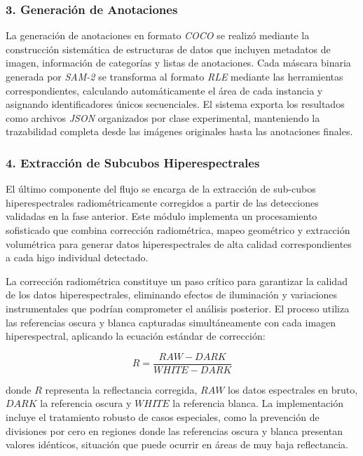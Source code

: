 \subsubsection{3. Generación de Anotaciones}

La generación de anotaciones en formato \emph{COCO} se realizó mediante la construcción sistemática de estructuras de datos que incluyen metadatos de imagen, información de categorías y listas de anotaciones. Cada máscara binaria generada por \emph{SAM-2} se transforma al formato \emph{RLE} mediante las herramientas correspondientes, calculando automáticamente el área de cada instancia y asignando identificadores únicos secuenciales. El sistema exporta los resultados como archivos \emph{JSON} organizados por clase experimental, manteniendo la trazabilidad completa desde las imágenes originales hasta las anotaciones finales.

\subsubsection{4. Extracción de Subcubos Hiperespectrales}

El último componente del flujo se encarga de la extracción de sub-cubos hiperespectrales radiométricamente corregidos a partir de las detecciones validadas en la fase anterior. Este módulo implementa un procesamiento sofisticado que combina corrección radiométrica, mapeo geométrico y extracción volumétrica para generar datos hiperespectrales de alta calidad correspondientes a cada higo individual detectado.

\vspace{5mm}

La corrección radiométrica constituye un paso crítico para garantizar la calidad de los datos hiperespectrales, eliminando efectos de iluminación y variaciones instrumentales que podrían comprometer el análisis posterior. El proceso utiliza las referencias oscura y blanca capturadas simultáneamente con cada imagen hiperespectral, aplicando la ecuación estándar de corrección:

\begin{equation}
R = \frac{RAW - DARK}{WHITE - DARK}
\end{equation}

donde $R$ representa la reflectancia corregida, $RAW$ los datos espectrales en bruto, $DARK$ la referencia oscura y $WHITE$ la referencia blanca. La implementación incluye el tratamiento robusto de casos especiales, como la prevención de divisiones por cero en regiones donde las referencias oscura y blanca presentan valores idénticos, situación que puede ocurrir en áreas de muy baja reflectancia.

